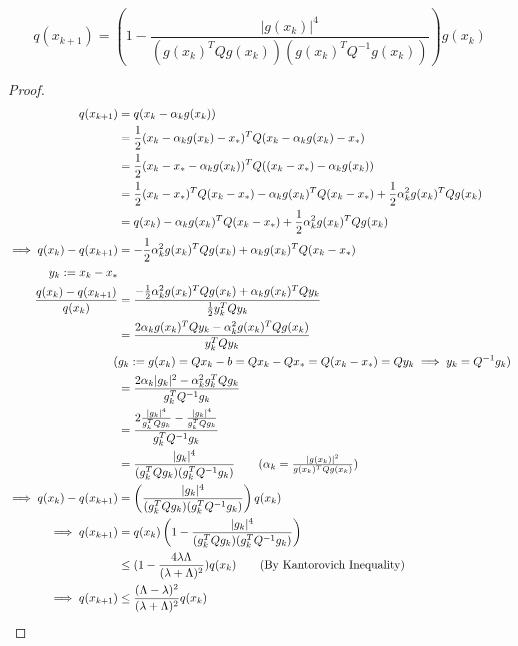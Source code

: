 \documentclass[11pt]{article}
\begin{document}
 \\
$$ q(x_{k+1}) = \left( 1 - \frac{|g(x_k)|^4}{(g(x_k)^TQ g(x_k))(g(x_k)^TQ^{-1}g(x_k))}\right)g(x_k)$$
\begin{proof}
\begin{align}
	q(x_{k+1}) &= q(x_k - \alpha_k g(x_k)) \\
	&= \frac{1}{2} (x_k - \alpha_k g(x_k) - x_*)^T Q (x_k - \alpha_k g(x_k) - x_*) \\
	&= \frac{1}{2} (x_k - x_* - \alpha_k g(x_k))^T Q ((x_k - x_*) - \alpha_k g(x_k)) \\
	&= \frac{1}{2} (x_k - x_*)^T Q (x_k - x_*) - \alpha_k g(x_k)^T Q (x_k - x_*) + \frac{1}{2} \alpha_k^2 g(x_k)^T Q g(x_k) \\
	&= q(x_k) - \alpha_k g(x_k)^T Q (x_k - x_*) + \frac{1}{2} \alpha_k^2 g(x_k)^T Q g(x_k) \\
	\implies q(x_k) - q(x_{k+1}) &= -\frac{1}{2} \alpha_k^2 g(x_k)^T Q g(x_k) + \alpha_k g(x_k)^T Q (x_k - x_*) \\
	y_k := x_k - x_* \\
	\frac{q(x_k) - q(x_{k+1})}{q(x_k)} &= \frac{-\frac{1}{2}\alpha_k^2 g(x_k)^T Q g(x_k) + \alpha_k g(x_k)^T Q y_k}{\frac{1}{2}y_k^T Q y_k}  \\
	&= \frac{2\alpha_k g(x_k)^T Q y_k - \alpha_k^2 g(x_k)^T Q g(x_k)}{y_k^T Q y_k} \\
	(&g_k := g(x_k) = Q x_k - b = Qx_k - Q x_* = Q (x_k - x_*) = Q y_k \implies y_k = Q^{-1}g_k) \\
	&= \frac{2\alpha_k|g_k|^2 - \alpha_k^2 g_k^T Q g_k}{g_k^TQ^{-1}g_k}\\ 
	&= \frac{2\frac{|g_k|^4}{g_k^TQg_k}  - \frac{|g_k|^4}{g_k^TQg_k}}{g_k^TQ^{-1}g_k}\\
	&= \frac{|g_k|^4}{(g_k^TQ g_k)(g_k^TQ^{-1}g_k)} \tag{$\alpha_k = \frac{|g(x_k)|^2}{g(x_k)^T Q g(x_k)}$} \\
	\implies q(x_k) - q(x_{k+1}) &= \left( \frac{|g_k|^4}{(g_k^TQ g_k)(g_k^TQ^{-1}g_k)} \right ) q(x_k) \\
	\implies q(x_{k+1}) &= q(x_k)\left( 1 - \frac{|g_k|^4}{(g_k^TQ g_k)(g_k^TQ^{-1}g_k)} \right) \\
	&\leq (1 - \frac{4 \lambda \Lambda}{(\lambda + \Lambda)^2}) q(x_k) \tag{By Kantorovich Inequality} \\
	\implies q(x_{k+1}) &\leq \frac{(\Lambda - \lambda)^2}{(\lambda + \Lambda)^2} q(x_k)
\end{align}

\end{proof}
\end{document}
